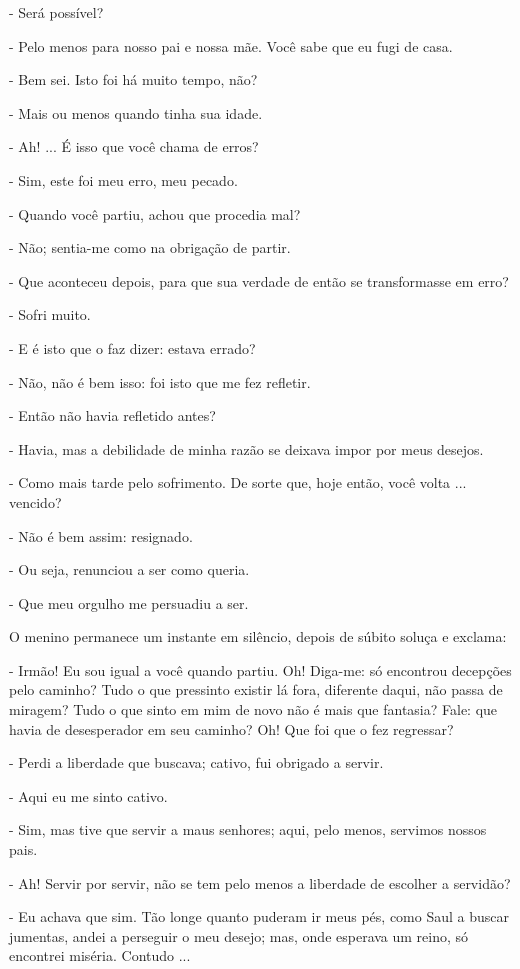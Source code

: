 - Será possível?

- Pelo menos para nosso pai e nossa mãe. Você sabe que eu fugi de casa.

- Bem sei. Isto foi há muito tempo, não?

- Mais ou menos quando tinha sua idade.

- Ah! ... É isso que você chama de erros?

- Sim, este foi meu erro, meu pecado.

- Quando você partiu, achou que procedia mal?

- Não; sentia-me como na obrigação de partir.

- Que aconteceu depois, para que sua verdade de então se transformasse
em erro?

- Sofri muito.

- E é isto que o faz dizer: estava errado?

- Não, não é bem isso: foi isto que me fez refletir.

- Então não havia refletido antes?

- Havia, mas a debilidade de minha razão se deixava impor por meus
desejos.

- Como mais tarde pelo sofrimento. De sorte que, hoje então, você volta
... vencido?

- Não é bem assim: resignado.

- Ou seja, renunciou a ser como queria.

- Que meu orgulho me persuadiu a ser.

O menino permanece um instante em silêncio, depois de súbito soluça e
exclama:

- Irmão! Eu sou igual a você quando partiu. Oh! Diga-me: só encontrou
decepções pelo caminho? Tudo o que pressinto existir lá fora, diferente
daqui, não passa de miragem? Tudo o que sinto em mim de novo não é mais
que fantasia? Fale: que havia de desesperador em seu caminho? Oh! Que
foi que o fez regressar?

- Perdi a liberdade que buscava; cativo, fui obrigado a servir.

- Aqui eu me sinto cativo.

- Sim, mas tive que servir a maus senhores; aqui, pelo menos, servimos
nossos pais.

- Ah! Servir por servir, não se tem pelo menos a liberdade de escolher a
servidão?

- Eu achava que sim. Tão longe quanto puderam ir meus pés, como Saul a
buscar jumentas, andei a perseguir o meu desejo; mas, onde esperava um
reino, só encontrei miséria. Contudo ...

